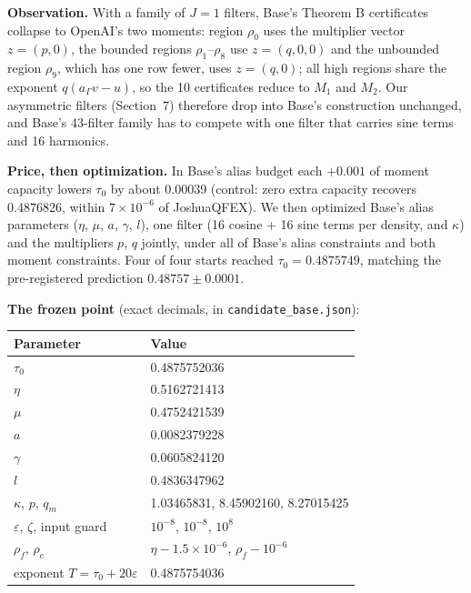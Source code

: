 \documentclass[11pt]{article}
\newcommand{\eps}{\varepsilon}
\theoremstyle{plain}
\begin{document}
\textbf{Observation.} With a family of $J = 1$ filters, Base's Theorem B certificates collapse to OpenAI's two moments: region $\rho_0$ uses the multiplier vector $z = (p, 0)$, the bounded regions $\rho_1$--$\rho_8$ use $z = (q, 0, 0)$ and the unbounded region $\rho_9$, which has one row fewer, uses $z = (q, 0)$; all high regions share the exponent $q(a_\Gamma v - u)$, so the 10 certificates reduce to $M_1$ and $M_2$. Our asymmetric filters (Section~7) therefore drop into Base's construction unchanged, and Base's 43-filter family has to compete with one filter that carries sine terms and 16 harmonics.

\textbf{Price, then optimization.} In Base's alias budget each $+0.001$ of moment capacity lowers $\tau_0$ by about 0.00039 (control: zero extra capacity recovers 0.4876826, within $7\times10^{-6}$ of JoshuaQFEX). We then optimized Base's alias parameters ($\eta$, $\mu$, $a$, $\gamma$, $l$), one filter (16 cosine + 16 sine terms per density, and $\kappa$) and the multipliers $p$, $q$ jointly, under all of Base's alias constraints and both moment constraints. Four of four starts reached $\tau_0 = 0.4875749$, matching the pre-registered prediction $0.48757 \pm 0.0001$.

\textbf{The frozen point} (exact decimals, in \texttt{candidate\_base.json}):

\begin{center}
\small
\begin{tabular}{ll}
\toprule
Parameter & Value \\
\midrule
$\tau_0$ & 0.4875752036 \\
$\eta$ & 0.5162721413 \\
$\mu$ & 0.4752421539 \\
$a$ & 0.0082379228 \\
$\gamma$ & 0.0605824120 \\
$l$ & 0.4836347962 \\
$\kappa$, $p$, $q_m$ & 1.03465831, 8.45902160, 8.27015425 \\
$\eps$, $\zeta$, input guard & $10^{-8}$, $10^{-8}$, $10^{8}$ \\
$\rho_f$, $\rho_c$ & $\eta - 1.5\times10^{-6}$, $\rho_f - 10^{-6}$ \\
exponent $T = \tau_0 + 20\eps$ & 0.4875754036 \\
\bottomrule
\end{tabular}
\end{center}
\end{document}
